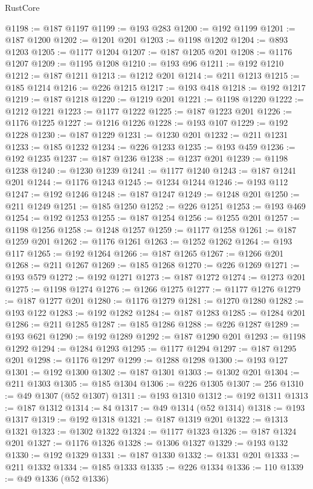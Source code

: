 \begin{lexlean}{RustCore}
\begin{coremodule}
@1198 := @187 @1197
@1199 := @193 @283
@1200 := @192 @1199
@1201 := @187 @1200
@1202 := @1201 @201
@1203 := @1198 @1202
@1204 := @893 @1203
@1205 := @1177 @1204
@1207 := @187 @1205 @201
@1208 := @1176 @1207
@1209 := @1195 @1208
@1210 := @193 @96
@1211 := @192 @1210
@1212 := @187 @1211
@1213 := @1212 @201
@1214 := @211 @1213
@1215 := @185 @1214
@1216 := @226 @1215
@1217 := @193 @418
@1218 := @192 @1217
@1219 := @187 @1218
@1220 := @1219 @201
@1221 := @1198 @1220
@1222 := @1212 @1221
@1223 := @1177 @1222
@1225 := @187 @1223 @201
@1226 := @1176 @1225
@1227 := @1216 @1226
@1228 := @193 @107
@1229 := @192 @1228
@1230 := @187 @1229
@1231 := @1230 @201
@1232 := @211 @1231
@1233 := @185 @1232
@1234 := @226 @1233
@1235 := @193 @459
@1236 := @192 @1235
@1237 := @187 @1236
@1238 := @1237 @201
@1239 := @1198 @1238
@1240 := @1230 @1239
@1241 := @1177 @1240
@1243 := @187 @1241 @201
@1244 := @1176 @1243
@1245 := @1234 @1244
@1246 := @193 @112
@1247 := @192 @1246
@1248 := @187 @1247
@1249 := @1248 @201
@1250 := @211 @1249
@1251 := @185 @1250
@1252 := @226 @1251
@1253 := @193 @469
@1254 := @192 @1253
@1255 := @187 @1254
@1256 := @1255 @201
@1257 := @1198 @1256
@1258 := @1248 @1257
@1259 := @1177 @1258
@1261 := @187 @1259 @201
@1262 := @1176 @1261
@1263 := @1252 @1262
@1264 := @193 @117
@1265 := @192 @1264
@1266 := @187 @1265
@1267 := @1266 @201
@1268 := @211 @1267
@1269 := @185 @1268
@1270 := @226 @1269
@1271 := @193 @579
@1272 := @192 @1271
@1273 := @187 @1272
@1274 := @1273 @201
@1275 := @1198 @1274
@1276 := @1266 @1275
@1277 := @1177 @1276
@1279 := @187 @1277 @201
@1280 := @1176 @1279
@1281 := @1270 @1280
@1282 := @193 @122
@1283 := @192 @1282
@1284 := @187 @1283
@1285 := @1284 @201
@1286 := @211 @1285
@1287 := @185 @1286
@1288 := @226 @1287
@1289 := @193 @621
@1290 := @192 @1289
@1292 := @187 @1290 @201
@1293 := @1198 @1292
@1294 := @1284 @1293
@1295 := @1177 @1294
@1297 := @187 @1295 @201
@1298 := @1176 @1297
@1299 := @1288 @1298
@1300 := @193 @127
@1301 := @192 @1300
@1302 := @187 @1301
@1303 := @1302 @201
@1304 := @211 @1303
@1305 := @185 @1304
@1306 := @226 @1305
@1307 := 256
@1310 := @49 @1307 (@52 @1307)
@1311 := @193 @1310
@1312 := @192 @1311
@1313 := @187 @1312
@1314 := 84
@1317 := @49 @1314 (@52 @1314)
@1318 := @193 @1317
@1319 := @192 @1318
@1321 := @187 @1319 @201
@1322 := @1313 @1321
@1323 := @1302 @1322
@1324 := @1177 @1323
@1326 := @187 @1324 @201
@1327 := @1176 @1326
@1328 := @1306 @1327
@1329 := @193 @132
@1330 := @192 @1329
@1331 := @187 @1330
@1332 := @1331 @201
@1333 := @211 @1332
@1334 := @185 @1333
@1335 := @226 @1334
@1336 := 110
@1339 := @49 @1336 (@52 @1336)

\end{coremodule}
\end{lexlean}
